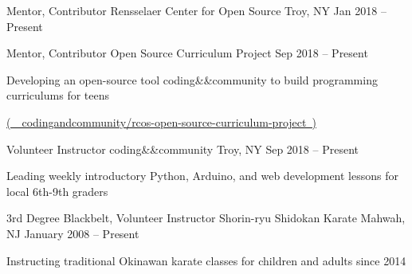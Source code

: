 


\begin{cventries}

  \cventry
  {Mentor, Contributor}
  {Rensselaer Center for Open Source}
  {Troy, NY}
  {Jan 2018 -- Present}
  {
    \vspace*{-1\abovedisplayskip}
    \begin{cvsubentries}
      \cvsubentry
      {Mentor, Contributor}
      {Open Source Curriculum Project}
      {Sep 2018 -- Present}
      {
        \begin{cvitems}
          \item Developing an open-source tool coding\&\&community to build programming curriculums for teens
          \item[] \href{https://github.com/codingandcommunity/rcos-open-source-curriculum-project}{(\ \faGithubSquare\ codingandcommunity/rcos-open-source-curriculum-project\ )}
        \end{cvitems}
      }
    \end{cvsubentries}
    \vspace*{-1\belowdisplayskip}
  }


  \cventry
  {Volunteer Instructor}
  {coding\&\&community}
  {Troy, NY}
  {Sep 2018 -- Present}
  {
    \begin{cvitems}
      \item Leading weekly introductory Python, Arduino, and web development lessons for local 6th-9th graders
    \end{cvitems}
  }


  \cventry
  {3rd Degree Blackbelt, Volunteer Instructor}
  {Shorin-ryu Shidokan Karate}
  {Mahwah, NJ}
  {January 2008 -- Present}
  {
    \begin{cvitems}
      \item Instructing traditional Okinawan karate classes for children and adults since 2014
    \end{cvitems}
  }


\end{cventries}